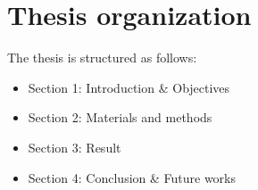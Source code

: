 \section{Thesis organization}
The thesis is structured as follows:
\begin{itemize}
    \item Section 1: Introduction \& Objectives
    \item Section 2: Materials and methods
    \item Section 3: Result
    \item Section 4: Conclusion \& Future works
\end{itemize}
